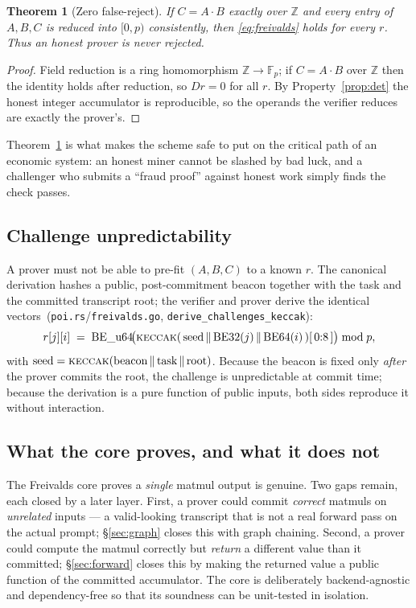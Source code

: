 \documentclass[11pt,a4paper]{article}
\newtheorem{theorem}{Theorem}
\begin{document}
\begin{theorem}[Zero false-reject]\label{thm:zero-fr}
If $C = A \cdot B$ exactly over $\mathbb{Z}$ and every entry of $A, B, C$ is reduced into $[0,p)$ consistently, then \eqref{eq:freivalds} holds for \emph{every} $r$. Thus an honest prover is never rejected.
\end{theorem}

\begin{proof}
Field reduction is a ring homomorphism $\mathbb{Z} \to \mathbb{F}_p$; if $C = A \cdot B$ over $\mathbb{Z}$ then the identity holds after reduction, so $Dr = 0$ for all $r$. By Property~\ref{prop:det} the honest integer accumulator is reproducible, so the operands the verifier reduces are exactly the prover's.
\end{proof}

Theorem~\ref{thm:zero-fr} is what makes the scheme safe to put on the critical path of an economic system: an honest miner cannot be slashed by bad luck, and a challenger who submits a ``fraud proof'' against honest work simply finds the check passes.

\subsection{Challenge unpredictability}

A prover must not be able to pre-fit $(A,B,C)$ to a known $r$. The canonical derivation hashes a public, post-commitment beacon together with the task and the committed transcript root; the verifier and prover derive the identical vectors~(\texttt{poi.rs}/\texttt{freivalds.go}, \texttt{derive\_challenges\_keccak}):
\[
  r[j][i] \;=\; \mathrm{BE\_u64}\!\big(\textsc{keccak}(\,\text{seed} \,\|\, \mathrm{BE32}(j) \,\|\, \mathrm{BE64}(i)\,)[\,0{:}8\,]\big) \bmod p,
\]
with $\text{seed} = \textsc{keccak}(\text{beacon} \,\|\, \text{task} \,\|\, \text{root})$. Because the beacon is fixed only \emph{after} the prover commits the root, the challenge is unpredictable at commit time; because the derivation is a pure function of public inputs, both sides reproduce it without interaction.

\subsection{What the core proves, and what it does not}

The Freivalds core proves a \emph{single} matmul output is genuine. Two gaps remain, each closed by a later layer. First, a prover could commit \emph{correct} matmuls on \emph{unrelated} inputs --- a valid-looking transcript that is not a real forward pass on the actual prompt; \S\ref{sec:graph} closes this with graph chaining. Second, a prover could compute the matmul correctly but \emph{return} a different value than it committed; \S\ref{sec:forward} closes this by making the returned value a public function of the committed accumulator. The core is deliberately backend-agnostic and dependency-free so that its soundness can be unit-tested in isolation.
\end{document}
